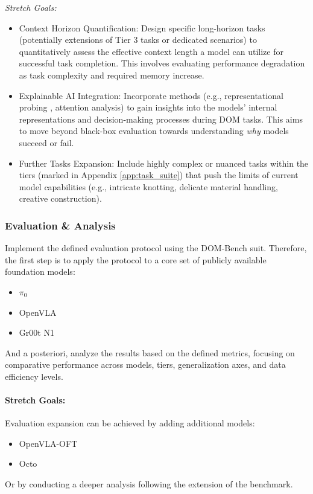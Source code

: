 \textit{Stretch Goals:} \newline

\begin{itemize}
    \item Context Horizon Quantification: Design specific long-horizon tasks (potentially extensions of Tier 3 tasks or dedicated scenarios) to quantitatively assess the effective context length a model can utilize for successful task completion. This involves evaluating performance degradation as task complexity and required memory increase.
    \item Explainable AI Integration: Incorporate methods (e.g., representational probing \cite{Probing-VLA}, attention analysis) to gain insights into the models' internal representations and decision-making processes during DOM tasks. This aims to move beyond black-box evaluation towards understanding \textit{why} models succeed or fail.
    \item Further Tasks Expansion: Include highly complex or nuanced tasks within the tiers (marked in Appendix \ref{app:task_suite}) that push the limits of current model capabilities (e.g., intricate knotting, delicate material handling, creative construction).
\end{itemize}


\subsubsection{Evaluation \& Analysis}
Implement the defined evaluation protocol using the DOM-Bench suit. Therefore, the first step is to apply the protocol to a core set of publicly available foundation models:
\begin{itemize}
    \item $\pi_0$ \cite{pi_zero}
    \item OpenVLA \cite{OpenVLA}
    \item Gr00t N1 \cite{Gr00tN1}
\end{itemize}
And a posteriori, analyze the results based on the defined metrics, focusing on comparative performance across models, tiers, generalization axes, and data efficiency levels.

\paragraph{Stretch Goals:}


Evaluation expansion can be achieved by adding additional models:
    \begin{itemize}
        \item OpenVLA-OFT \cite{OpenVLA-OFT}
        \item Octo \cite{Octo}
    \end{itemize}
Or by conducting a deeper analysis following the extension of the benchmark.


